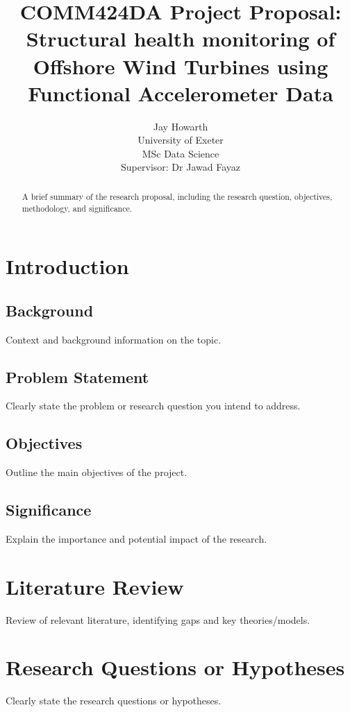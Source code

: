 \documentclass[twocolumn]{article}
\begin{document}
\title{COMM424DA Project Proposal: Structural health monitoring of Offshore Wind Turbines using Functional Accelerometer Data}
\author{Jay Howarth \\
        University of Exeter \\
        MSc Data Science \\
        Supervisor: Dr Jawad Fayaz}
\maketitle

\begin{abstract}
A brief summary of the research proposal, including the research question, objectives, methodology, and significance.
\end{abstract}

\section{Introduction}
\subsection{Background}
Context and background information on the topic.

\subsection{Problem Statement}
Clearly state the problem or research question you intend to address.

\subsection{Objectives}
Outline the main objectives of the project.

\subsection{Significance}
Explain the importance and potential impact of the research.

\section{Literature Review}
Review of relevant literature, identifying gaps and key theories/models.

\section{Research Questions or Hypotheses}
Clearly state the research questions or hypotheses.
\end{document}
